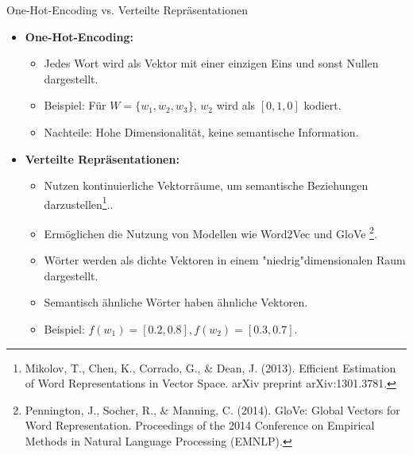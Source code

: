 \documentclass[aspectratio=1610, xcolor=dvipsnames, 9pt]{beamer}
\begin{document}
\begin{frame}{One-Hot-Encoding vs. Verteilte Repräsentationen}
  \begin{itemize}
    \item \textbf{One-Hot-Encoding:}
      \begin{itemize}
        \item Jedes Wort wird als Vektor mit einer einzigen Eins und sonst Nullen dargestellt.
        \item Beispiel: Für \( W = \{w_1, w_2, w_3\} \), \( w_2 \) wird als \( [0, 1, 0] \) kodiert.
        \item Nachteile: Hohe Dimensionalität, keine semantische Information.
      \end{itemize}
      \vspace{0.5cm}
    \item \textbf{Verteilte Repräsentationen:}
      \begin{itemize}
        \item Nutzen kontinuierliche Vektorräume, um semantische Beziehungen darzustellen\footnote{Mikolov, T., Chen, K., Corrado, G., \& Dean, J. (2013). Efficient Estimation of Word Representations in Vector Space. arXiv preprint arXiv:1301.3781.}..
        \item Ermöglichen die Nutzung von Modellen wie Word2Vec und GloVe
        \footnote{Pennington, J., Socher, R., \& Manning, C. (2014). GloVe: Global Vectors for Word Representation. Proceedings of the 2014 Conference on Empirical Methods in Natural Language Processing (EMNLP).}.
        \item Wörter werden als dichte Vektoren in einem "niedrig"dimensionalen Raum dargestellt.
        \item Semantisch ähnliche Wörter haben ähnliche Vektoren.
        \item Beispiel: \( f(w_1) = [0.2, 0.8], f(w_2) = [0.3, 0.7] \).
      \end{itemize}
  \end{itemize}
\end{frame}
\end{document}
